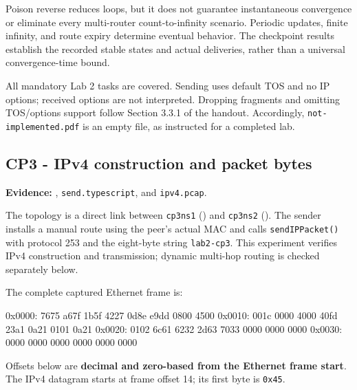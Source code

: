 \documentclass[
  a4paper,
  10pt]{article}
\newenvironment{Shaded}{}{}
\newcommand{\NormalTok}[1]{#1}
\begin{document}
Poison reverse reduces loops, but it does not guarantee instantaneous
convergence or eliminate every multi-router count-to-infinity scenario.
Periodic updates, finite infinity, and route expiry determine eventual
behavior. The checkpoint results establish the recorded stable states
and actual deliveries, rather than a universal convergence-time bound.

All mandatory Lab 2 tasks are covered. Sending uses default TOS and no
IP options; received options are not interpreted. Dropping fragments and
omitting TOS/options support follow Section 3.3.1 of the handout.
Accordingly, \texttt{not-implemented.pdf} is an empty file, as
instructed for a completed lab.

\newpage

\subsection{CP3 - IPv4 construction and packet
bytes}\label{cp3---ipv4-construction-and-packet-bytes}

\textbf{Evidence:} {\ttfamily{}},
\texttt{send.typescript}, and \texttt{ipv4.pcap}.

The topology is a direct link between \texttt{cp3ns1}
({\ttfamily{}}) and \texttt{cp3ns2}
({\ttfamily{}}). The sender installs a
{\ttfamily{}} manual route using the peer's actual MAC and calls
\texttt{sendIPPacket()} with protocol 253 and the eight-byte string
\texttt{lab2-cp3}. This experiment verifies IPv4 construction and
transmission; dynamic multi-hop routing is checked separately below.

The complete captured Ethernet frame is:

\begin{Shaded}
\begin{Highlighting}[]
\NormalTok{0x0000: 7675 a67f 1b5f 4227 0d8e e9dd 0800 4500}
\NormalTok{0x0010: 001c 0000 4000 40fd 23a1 0a21 0101 0a21}
\NormalTok{0x0020: 0102 6c61 6232 2d63 7033 0000 0000 0000}
\NormalTok{0x0030: 0000 0000 0000 0000 0000 0000}
\end{Highlighting}
\end{Shaded}

Offsets below are \textbf{decimal and zero-based from the Ethernet frame
start}. The IPv4 datagram starts at frame offset 14; its first byte is
\texttt{0x45}.
\end{document}
